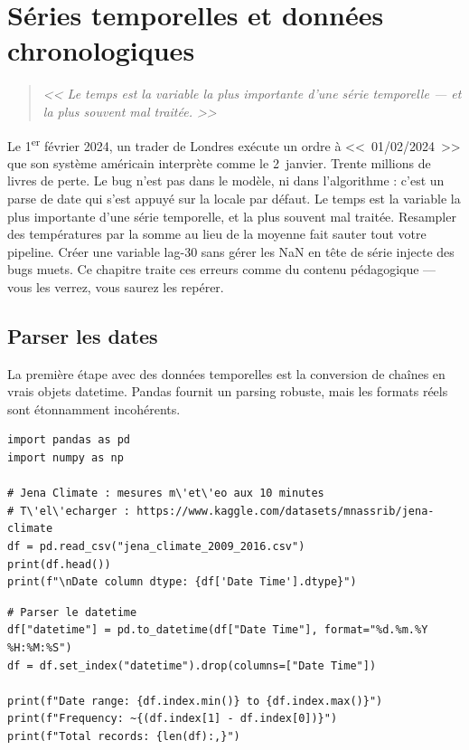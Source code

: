 \chapter{S\'eries temporelles et donn\'ees chronologiques}
\label{ch:temporal-data}

\begin{quote}
\emph{<< Le temps est la variable la plus importante d'une s\'erie temporelle --- et la plus souvent mal trait\'ee. >>}
\end{quote}

Le 1\textsuperscript{er} février 2024, un trader de Londres exécute un ordre à <<~01/02/2024~>> que son système américain interprète comme le 2~janvier. Trente millions de livres de perte. Le bug n'est pas dans le modèle, ni dans l'algorithme : c'est un parse de date qui s'est appuyé sur la locale par défaut. Le temps est la variable la plus importante d'une série temporelle, et la plus souvent mal traitée. Resampler des températures par la somme au lieu de la moyenne fait sauter tout votre pipeline. Créer une variable lag-30 sans gérer les NaN en tête de série injecte des bugs muets. Ce chapitre traite ces erreurs comme du contenu pédagogique --- vous les verrez, vous saurez les repérer.
\section{Parser les dates}

La premi\`ere \'etape avec des donn\'ees temporelles est la conversion de cha\^ines en vrais objets datetime. Pandas fournit un parsing robuste, mais les formats r\'eels sont \'etonnamment incoh\'erents.

\begin{verbatim}
import pandas as pd
import numpy as np

# Jena Climate : mesures m\'et\'eo aux 10 minutes
# T\'el\'echarger : https://www.kaggle.com/datasets/mnassrib/jena-climate
df = pd.read_csv("jena_climate_2009_2016.csv")
print(df.head())
print(f"\nDate column dtype: {df['Date Time'].dtype}")
\end{verbatim}

\begin{verbatim}
# Parser le datetime
df["datetime"] = pd.to_datetime(df["Date Time"], format="%d.%m.%Y %H:%M:%S")
df = df.set_index("datetime").drop(columns=["Date Time"])

print(f"Date range: {df.index.min()} to {df.index.max()}")
print(f"Frequency: ~{(df.index[1] - df.index[0])}")
print(f"Total records: {len(df):,}")
\end{verbatim}

